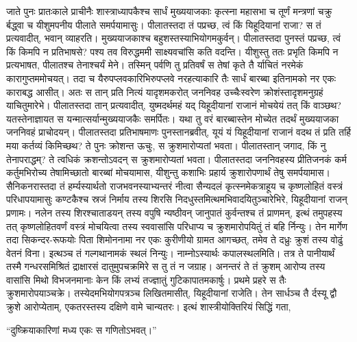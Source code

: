 \adhyAya
{}
\vakya जाते पुनः प्रातःकाले प्राचीनैः शास्त्राध्यापकैश्च सार्धं मुख्ययाजकाः कृत्स्ना महासभा च तूर्णं मन्त्रणां चक्रु र्बद्ध्वा च यीशुमपनीय पीलाते समर्पयामासुः।
\vakya पीलातस्तदा तं पप्रच्छ, त्वं किं यिहूदियानां राजा? स तं प्रत्यवादीत्, भवान् व्याहरति।
\vakya मुख्ययाजकाश्च बहुशस्तस्याभियोगमकुर्वन्।
\vakya पीलातस्तदा पुनस्तं पप्रच्छ, त्वं किं किमपि न प्रतिभाषसे? पश्य तव विरुद्धममी साक्ष्यवचांसि कति वदन्ति।
\vakya यीशुस्तु ततः प्रभृति किमपि न प्रत्यभाषत, पीलातश्च तेनाश्चर्यं मेने।
\vakya तस्मिन् पर्वणि तु प्रतिवर्षं स तेषां कृते तै र्याचितं नरमेकं कारागुप्तममोचयत्।
\vakya तदा च यैरुपप्लवकारिभिरुपप्लवे नरहत्याकारि तैः सार्धं बारब्बा इतिनामको नर एकः काराबद्ध आसीत्।
\vakya अतः स तान् प्रति नित्यं यादृशमकरोत् जननिवह उच्चैःस्वरेण क्रोशंस्तादृशमनुग्रहं याचितुमारेभे।
\vakya पीलातस्तदा तान् प्रत्यवादीत्, युष्मदर्थमहं यद् यिहूदीयानां राजानं मोचयेयं तत् किं वाञ्छथ?
\vakya यतस्तेनाज्ञायत स यन्मात्सर्यान्मुख्ययाजकैः समर्पितः।
\vakya यथा तु वरं बारब्बास्तेन मोच्येत तदर्थं मुख्ययाजका जननिवहं प्राचोदयन्।
\vakya पीलातस्तदा प्रतिभाषमाणः पुनस्तानब्रवीत्, यूयं यं यिहूदीयानां राजानं वदथ तं प्रति तर्हि मया कर्तव्यं किमिच्छथ?
\vakya ते पुनः क्रोशन्त ऊचुः, स क्रुशमारोप्यतां भवता।
\vakya पीलातस्तान् जगाद, किं नु तेनापराद्धम्? ते त्वधिकं क्रशन्तोऽवदन् स क्रुशमारोप्यतां भवता।
\vakya पीलातस्तदा जननिवहस्य प्रीतिजनकं कर्म कर्तुमभिरोच्य तेषामिच्छातो बारब्बां मोचयामास, यीशुन्तु कशाभिः प्रहार्य क्रुशारोपणार्थं तेषु समर्पयामास।
\vakya सैनिकनरास्तदा तं हर्म्यस्यार्थतो राजभवनस्याभ्यन्तरं नीत्वा सैन्यदलं कृत्स्नमेकत्राहूय च
\vakya कृष्णलोहितं वस्त्रं परिधापयामासुः कण्टकैश्च स्रजं निर्माय तस्य शिरसि निदधुस्तमित्थमभिवादयितुञ्चारेभिरे,
\vakya यिहूदीयानां राजन् प्रणामः।
\vakya नलेन तस्य शिरश्चाताडयन् तस्य वपुषि न्यष्ठीवन् जानुपातं कुर्वन्तश्च तं प्राणमन्,
\vakya इत्थं तमुपहस्य तत् कृष्णलोहितवर्णं वस्त्रं मोचयित्वा तस्य स्ववासांसि परिधाप्य च क्रुशमारोपयितुं तं बहि र्निन्युः।
\vakya तेन मार्गेण तदा सिकन्दर-रूफयोः पिता शिमोननामा नर एकः कुरीणीयो ग्रामत आगच्छत्, तमेव ते दध्रुः क्रुशं तस्य वोढुं वेतनं विना।
\vakya इत्थञ्च तं गल्गथानामकं स्थलं निन्युः। नाम्नोऽस्यार्थः कपालस्थलमिति।
\vakya तत्र ते पानीयार्थं तस्मै गन्धरसमिश्रितं द्राक्षारसं दातुमुपचक्रमिरे स तु तं न जग्राह।
\vakya अनन्तरं ते तं क्रुशम् आरोप्य तस्य वासांसि मिथो विभजनमानाः केन किं लभ्यं तज्ज्ञातुं गुटिकापातमकार्षुः।
\vakya प्रथमे प्रहरे स तैः क्रुशमारोपयाञ्चक्रे।
\vakya तस्येदमभियोगपत्रञ्च लिखितमासीत्, यिहूदीयानां राजेति।
\vakya तेन सार्धञ्च तै र्दस्यू द्वौ क्रुशे आरोप्येताम्, एकतरस्तस्य दक्षिणे वामे चान्यतरः। 
\vakya इत्थं शास्त्रीयोक्तिरियं सिद्धिं गता,
\begin{poem}
\startwithline “दुष्क्रियाकारिणां मध्य एकः स गणितोऽभवत्।”
\end{poem}
